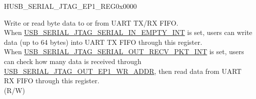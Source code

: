 \begin{register}{H}{USB\_SERIAL\_JTAG\_EP1\_REG}{0x0000}\label{regdesc:USBSERIALJTAGEP1REG}
%
%
\regnewline%
\begin{regdesc}\begin{reglist}
\label{fielddesc:USBSERIALJTAGRDWRBYTE}\item [USB\_SERIAL\_JTAG\_RDWR\_BYTE] Write or read byte data to or from UART TX/RX FIFO. \\
When \hyperref[int:USBSERIALJTAGSERIALINEMPTYINT]{USB\_SERIAL\_JTAG\_SERIAL\_IN\_EMPTY\_INT} is set, users can write data (up to 64 bytes) into UART TX FIFO through this register.\\
When \hyperref[int:USBSERIALJTAGSERIALOUTRECVPKTINT]{USB\_SERIAL\_JTAG\_SERIAL\_OUT\_RECV\_PKT\_INT} is set, users can check how many data is received through \hyperref[fielddesc:USBSERIALJTAGOUTEP1WRADDR]{USB\_SERIAL\_JTAG\_OUT\_EP1\_WR\_ADDR}, then read data from UART RX FIFO through this register. \\
(R/W)
\end{reglist}\end{regdesc}
\end{register}


